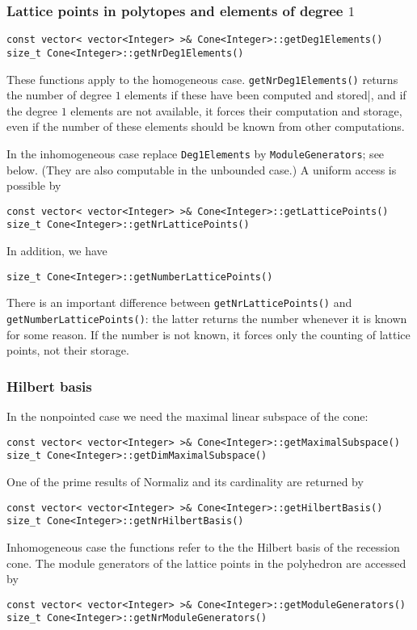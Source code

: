 \documentclass[12pt,a4paper]{scrartcl}
\theoremstyle{definition}
\begin{document}
\begin{small}
\subsubsection{Lattice points in polytopes and elements of degree $1$}

\begin{Verbatim}
const vector< vector<Integer> >& Cone<Integer>::getDeg1Elements()
size_t Cone<Integer>::getNrDeg1Elements()
\end{Verbatim}
These functions apply to the homogeneous case. \verb|getNrDeg1Elements()| returns the number of degree $1$ elements if these have been computed and stored|, and if the degree $1$ elements are not available, it forces their computation and storage, even if the number of these elements should be known from other computations.

In the inhomogeneous case replace \verb|Deg1Elements| by \verb|ModuleGenerators|; see below. (They are also computable in the unbounded case.) A uniform access is possible by
\begin{Verbatim}
const vector< vector<Integer> >& Cone<Integer>::getLatticePoints()
size_t Cone<Integer>::getNrLatticePoints()
\end{Verbatim}

In addition, we have
\begin{Verbatim}
size_t Cone<Integer>::getNumberLatticePoints()
\end{Verbatim}
There is an important difference between \verb|getNrLatticePoints()| and \verb|getNumberLatticePoints()|: the latter returns the number whenever it is known for some reason. If the number is not known, it forces only the counting of lattice points, not their storage.

\subsubsection{Hilbert basis}\label{HB_lib}

In the nonpointed case we need the maximal linear subspace of the cone:
\begin{Verbatim}
const vector< vector<Integer> >& Cone<Integer>::getMaximalSubspace()
size_t Cone<Integer>::getDimMaximalSubspace()
\end{Verbatim}

One of the prime results of Normaliz and its cardinality are returned by
\begin{Verbatim}
const vector< vector<Integer> >& Cone<Integer>::getHilbertBasis()
size_t Cone<Integer>::getNrHilbertBasis()
\end{Verbatim}
Inhomogeneous case the functions refer to the the Hilbert basis of the recession cone. The module generators of the lattice points in the polyhedron are accessed by
\begin{Verbatim}
const vector< vector<Integer> >& Cone<Integer>::getModuleGenerators()
size_t Cone<Integer>::getNrModuleGenerators()
\end{Verbatim}


\end{small}
\end{document}
